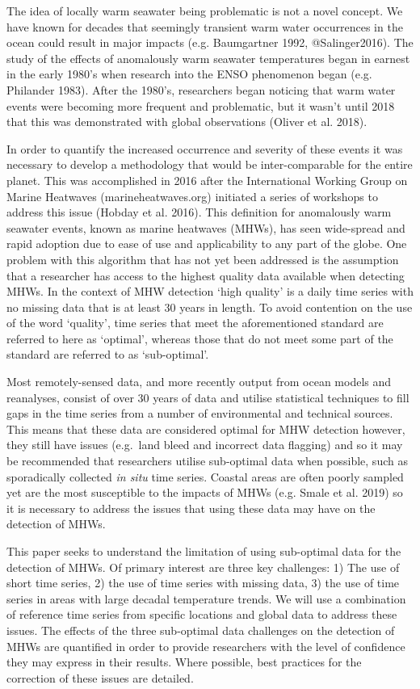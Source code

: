 \documentclass[]{article}
\begin{document}
The idea of locally warm seawater being problematic is not a novel
concept. We have known for decades that seemingly transient warm water
occurrences in the ocean could result in major impacts (e.g. Baumgartner
1992, @Salinger2016). The study of the effects of anomalously warm
seawater temperatures began in earnest in the early 1980's when research
into the ENSO phenomenon began (e.g. Philander 1983). After the 1980's,
researchers began noticing that warm water events were becoming more
frequent and problematic, but it wasn't until 2018 that this was
demonstrated with global observations (Oliver et al. 2018).

In order to quantify the increased occurrence and severity of these
events it was necessary to develop a methodology that would be
inter-comparable for the entire planet. This was accomplished in 2016
after the International Working Group on Marine Heatwaves
(marineheatwaves.org) initiated a series of workshops to address this
issue (Hobday et al. 2016). This definition for anomalously warm
seawater events, known as marine heatwaves (MHWs), has seen wide-spread
and rapid adoption due to ease of use and applicability to any part of
the globe. One problem with this algorithm that has not yet been
addressed is the assumption that a researcher has access to the highest
quality data available when detecting MHWs. In the context of MHW
detection `high quality' is a daily time series with no missing data
that is at least 30 years in length. To avoid contention on the use of
the word `quality', time series that meet the aforementioned standard
are referred to here as `optimal', whereas those that do not meet some
part of the standard are referred to as `sub-optimal'.

Most remotely-sensed data, and more recently output from ocean models
and reanalyses, consist of over 30 years of data and utilise statistical
techniques to fill gaps in the time series from a number of
environmental and technical sources. This means that these data are
considered optimal for MHW detection however, they still have issues
(e.g.~land bleed and incorrect data flagging) and so it may be
recommended that researchers utilise sub-optimal data when possible,
such as sporadically collected \emph{in situ} time series. Coastal areas
are often poorly sampled yet are the most susceptible to the impacts of
MHWs (e.g. Smale et al. 2019) so it is necessary to address the issues
that using these data may have on the detection of MHWs.

This paper seeks to understand the limitation of using sub-optimal data
for the detection of MHWs. Of primary interest are three key challenges:
1) The use of short time series, 2) the use of time series with missing
data, 3) the use of time series in areas with large decadal temperature
trends. We will use a combination of reference time series from specific
locations and global data to address these issues. The effects of the
three sub-optimal data challenges on the detection of MHWs are
quantified in order to provide researchers with the level of confidence
they may express in their results. Where possible, best practices for
the correction of these issues are detailed.
\end{document}
